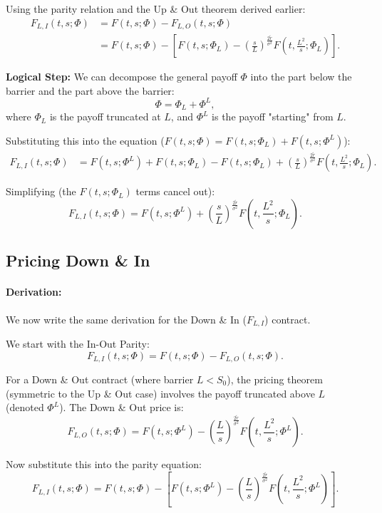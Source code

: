 \documentclass[12pt,a4paper]{article}
\theoremstyle{definition}
\begin{document}
Using the parity relation and the Up \& Out theorem derived earlier:
\[
\begin{aligned}
F_{L,I}(t, s; \Phi) &= F(t, s; \Phi) - F_{L,O}(t, s; \Phi) \\
&= F(t, s; \Phi) - \left[F(t, s; \Phi_L) - \left(\frac{s}{L}\right)^{\frac{2\widetilde{r}}{\sigma^2}} F\!\left(t, \frac{L^2}{s}; \Phi_L\right)\right].
\end{aligned}
\]

\textbf{Logical Step:} We can decompose the general payoff $\Phi$ into the part below the barrier and the part above the barrier:
\[
\Phi = \Phi_L + \Phi^L,
\]
where $\Phi_L$ is the payoff truncated at $L$, and $\Phi^L$ is the payoff "starting" from $L$.

Substituting this into the equation ($F(t, s; \Phi) = F(t, s; \Phi_L) + F(t, s; \Phi^L)$):
\[
\begin{aligned}
F_{L,I}(t, s; \Phi) &= F(t, s; \Phi^L) + F(t, s; \Phi_L) - F(t, s; \Phi_L) + \left(\frac{s}{L}\right)^{\frac{2\widetilde{r}}{\sigma^2}} F\!\left(t, \frac{L^2}{s}; \Phi_L\right).
\end{aligned}
\]

Simplifying (the $F(t, s; \Phi_L)$ terms cancel out):
\[
F_{L,I}(t, s; \Phi) = F(t, s; \Phi^L) + \left(\frac{s}{L}\right)^{\frac{2\widetilde{r}}{\sigma^2}} F\!\left(t, \frac{L^2}{s}; \Phi_L\right).
\]

\subsection{Pricing Down \& In}

\paragraph{Derivation:} We now write the same derivation for the Down \& In ($F_{L,I}$) contract.

We start with the In-Out Parity:
\[
F_{L,I}(t, s; \Phi) = F(t, s; \Phi) - F_{L,O}(t, s; \Phi).
\]

For a Down \& Out contract (where barrier $L < S_0$), the pricing theorem (symmetric to the Up \& Out case) involves the payoff truncated above $L$ (denoted $\Phi^L$). The Down \& Out price is:
\[
F_{L,O}(t, s; \Phi) = F(t, s; \Phi^L) - \left(\frac{L}{s}\right)^{\frac{2\widetilde{r}}{\sigma^2}} F\!\left(t, \frac{L^2}{s}; \Phi^L\right).
\]

Now substitute this into the parity equation:
\[
F_{L,I}(t, s; \Phi) = F(t, s; \Phi) - \left[F(t, s; \Phi^L) - \left(\frac{L}{s}\right)^{\frac{2\widetilde{r}}{\sigma^2}} F\!\left(t, \frac{L^2}{s}; \Phi^L\right)\right].
\]
\end{document}
